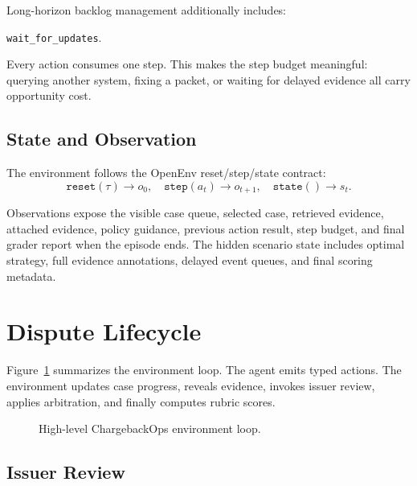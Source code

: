 \documentclass[11pt]{article}
\begin{document}
Long-horizon backlog management additionally includes:
\begin{center}
\texttt{wait\_for\_updates}.
\end{center}

Every action consumes one step. This makes the step budget meaningful: querying another system, fixing a packet, or waiting for delayed evidence all carry opportunity cost.

\subsection{State and Observation}

The environment follows the OpenEnv reset/step/state contract:
\begin{equation}
    \texttt{reset}(\tau) \rightarrow o_0, \quad
    \texttt{step}(a_t) \rightarrow o_{t+1}, \quad
    \texttt{state}() \rightarrow s_t.
\end{equation}

Observations expose the visible case queue, selected case, retrieved evidence, attached evidence, policy guidance, previous action result, step budget, and final grader report when the episode ends. The hidden scenario state includes optimal strategy, full evidence annotations, delayed event queues, and final scoring metadata.

\section{Dispute Lifecycle}

Figure~\ref{fig:architecture} summarizes the environment loop. The agent emits typed actions. The environment updates case progress, reveals evidence, invokes issuer review, applies arbitration, and finally computes rubric scores.

\begin{figure}[h]
\centering
{}
\caption{High-level ChargebackOps environment loop.}
\label{fig:architecture}
\end{figure}

\subsection{Issuer Review}
\end{document}
